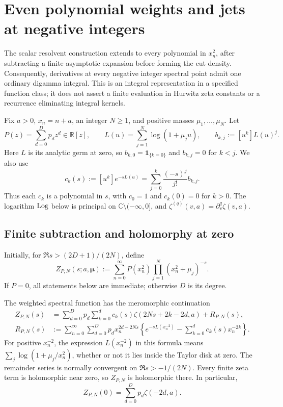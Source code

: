 \section{Even polynomial weights and jets at negative integers}
\label{ng:section}

The scalar resolvent construction extends to every polynomial in
$x_n^2$, after subtracting a finite asymptotic expansion before
forming the cut density.  Consequently, derivatives at every
negative integer spectral point admit one ordinary digamma
integral.  This is an integral representation in a specified
function class; it does not assert a finite evaluation in
Hurwitz zeta constants or a recurrence eliminating integral
kernels.

Fix $a>0$, $x_n=n+a$, an integer $N\geq1$, and positive masses
$\mu_1,\ldots,\mu_N$.  Let
\[
 P(z)=\sum_{d=0}^{D}p_dz^d\in\mathbb R[z],\qquad
 L(u)=\sum_{j=1}^{N}\log(1+\mu_j u),\qquad
 b_{k,j}:=[u^k]L(u)^j.
\]
Here $L$ is its analytic germ at zero, so
$b_{k,0}=\boldsymbol1_{\{k=0\}}$ and $b_{k,j}=0$ for $k<j$.
We also use
\[
 c_k(s):=[u^k]e^{-sL(u)}
   =\sum_{j=0}^{k}\frac{(-s)^j}{j!}b_{k,j}.
\]
Thus each $c_k$ is a polynomial in $s$, with $c_0=1$ and
$c_k(0)=0$ for $k>0$.  The logarithm $\operatorname{Log}$ below is principal
on $\mathbb C\setminus(-\infty,0]$, and
$\zeta^{(q)}(v,a)=\partial_v^q\zeta(v,a)$.


\subsection{Finite subtraction and holomorphy at zero}
\label{ng:continuation-subsection}

Initially, for $\Re s>(2D+1)/(2N)$, define
\begin{equation}
 Z_{P,N}(s;a,\boldsymbol\mu)
 :=\sum_{n=0}^{\infty}P(x_n^2)
                 \prod_{j=1}^{N}(x_n^2+\mu_j)^{-s}.
 \label{ng:weighted-definition}
\end{equation}
If $P=0$, all statements below are immediate; otherwise $D$
is its degree.

\begin{lemma}
\label{ng:finite-continuation}
The weighted spectral function has the meromorphic continuation
\begin{align}
 Z_{P,N}(s)
 &=\sum_{d=0}^{D}p_d\sum_{k=0}^{d}
       c_k(s)\zeta(2Ns+2k-2d,a)+R_{P,N}(s),
 \label{ng:continuation}\\
 R_{P,N}(s)
 &:=\sum_{n=0}^{\infty}\sum_{d=0}^{D}p_d x_n^{2d-2Ns}
       \left\{e^{-sL(x_n^{-2})}
                 -\sum_{k=0}^{d}c_k(s)x_n^{-2k}\right\}.
 \label{ng:normal-remainder}
\end{align}
For positive $x_n^{-2}$, the expression $L(x_n^{-2})$ in this
formula means $\sum_j\log(1+\mu_j/x_n^2)$, whether or not it
lies inside the Taylor disk at zero.
The remainder series is normally convergent on
$\Re s>-1/(2N)$.  Every finite zeta term is holomorphic near
zero, so $Z_{P,N}$ is holomorphic there.  In particular,
\begin{equation}
 Z_{P,N}(0)=\sum_{d=0}^{D}p_d\zeta(-2d,a).
 \label{ng:zeroth-jet}
\end{equation}
\end{lemma}

